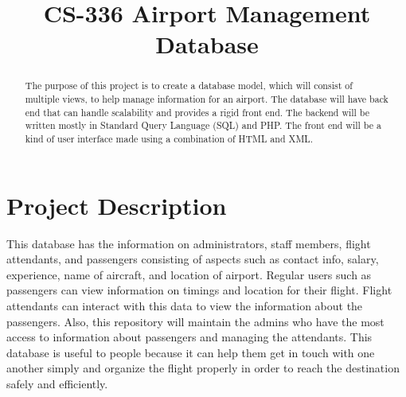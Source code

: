 \documentclass[10pt,conference]{IEEEtran}
\begin{document}
\title{CS-336 Airport Management Database}
\author{
\and
{}
\and
{}
}


                                                                                                                                                                                                                                                                               \maketitle


\begin{abstract}
\textnormal{
The purpose of this project is to create a database model, which will consist of multiple views, to help manage information for an airport. 
The database will have back end that can handle scalability and provides a rigid front end. The backend will be written mostly in Standard Query Language (SQL) and
PHP. The front end will be a kind of user interface made using a combination of HTML and XML.
}
\end{abstract}

\IEEEpeerreviewmaketitle
\section{Project Description}\label{sec:1. Project Description}
%
\textnormal{
This database has the information on administrators, staff members, flight attendants, and 
passengers consisting of aspects such as contact info, salary, experience, name of aircraft, and location of airport. Regular users such as passengers can view information on timings and location for their flight. Flight attendants can interact with this data to view the information about the passengers. Also, this repository will maintain the admins who have the most access to information about passengers and managing the attendants. This database is useful to people because it can help them get in touch with one another simply and organize the flight properly in order to reach the destination safely and efficiently. 
}
\end{document}
